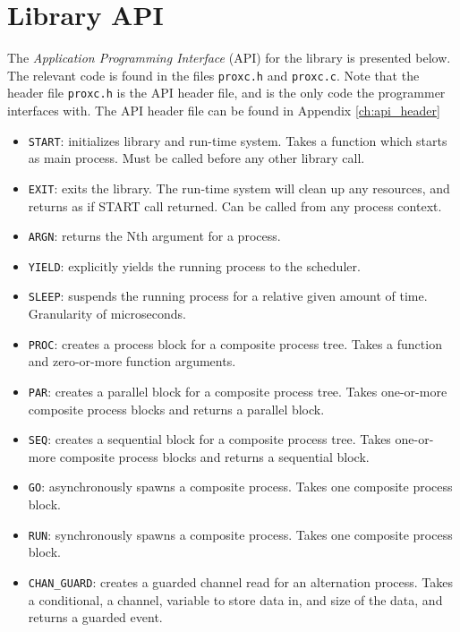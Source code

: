 \section{Library API}

The \textit{Application Programming Interface} (API) for the library is presented below. The relevant code is found in the files \texttt{proxc.h} and \texttt{proxc.c}. Note that the header file \texttt{proxc.h} is the API header file, and is the only code the programmer interfaces with. The API header file can be found in Appendix \ref{ch:api_header}

\begin{itemize}[topsep=0em,itemsep=-1em,partopsep=0.5em,parsep=1em]
    \item \texttt{START}: initializes library and run\hyp{}time system. Takes a function which starts as main process. Must be called before any other library call.
    \item \texttt{EXIT}: exits the library. The run\hyp{}time system will clean up any resources, and returns as if START call returned. Can be called from any process context. 
    \item \texttt{ARGN}: returns the Nth argument for a process. 
    \item \texttt{YIELD}: explicitly yields the running process to the scheduler.
    \item \texttt{SLEEP}: suspends the running process for a relative given amount of time. Granularity of microseconds. 
    \item \texttt{PROC}: creates a process block for a composite process tree. Takes a function and zero\hyp{}or\hyp{}more function arguments. 
    \item \texttt{PAR}: creates a parallel block for a composite process tree. Takes one\hyp{}or\hyp{}more composite process blocks and returns a parallel block.
    \item \texttt{SEQ}: creates a sequential block for a composite process tree. Takes one\hyp{}or\hyp{}more composite process blocks and returns a sequential block.
    \item \texttt{GO}: asynchronously spawns a composite process. Takes one composite process block.
    \item \texttt{RUN}: synchronously spawns a composite process. Takes one composite process block.
    \item \texttt{CHAN\_GUARD}: creates a guarded channel read for an alternation process. Takes a conditional, a channel, variable to store data in, and size of the data, and returns a guarded event.

\end{itemize}
